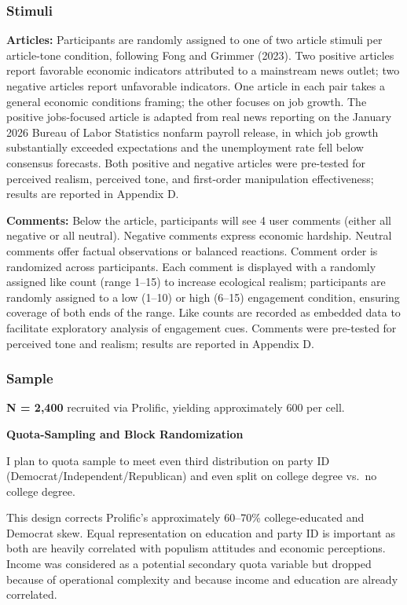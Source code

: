 \documentclass[
  12pt]{article}
\begin{document}
\subsubsection{Stimuli}\label{stimuli}

\textbf{Articles:} Participants are randomly assigned to one of two
article stimuli per article-tone condition, following Fong and Grimmer
(2023). Two positive articles report favorable economic indicators
attributed to a mainstream news outlet; two negative articles report
unfavorable indicators. One article in each pair takes a general
economic conditions framing; the other focuses on job growth. The
positive jobs-focused article is adapted from real news reporting on the
January 2026 Bureau of Labor Statistics nonfarm payroll release, in
which job growth substantially exceeded expectations and the
unemployment rate fell below consensus forecasts. Both positive and
negative articles were pre-tested for perceived realism, perceived tone,
and first-order manipulation effectiveness; results are reported in
Appendix D.

\textbf{Comments:} Below the article, participants will see 4 user
comments (either all negative or all neutral). Negative comments express
economic hardship. Neutral comments offer factual observations or
balanced reactions. Comment order is randomized across participants.
Each comment is displayed with a randomly assigned like count (range
1--15) to increase ecological realism; participants are randomly
assigned to a low (1--10) or high (6--15) engagement condition, ensuring
coverage of both ends of the range. Like counts are recorded as embedded
data to facilitate exploratory analysis of engagement cues. Comments
were pre-tested for perceived tone and realism; results are reported in
Appendix D.

\subsubsection{Sample}\label{sample}

\textbf{N = 2,400} recruited via Prolific, yielding approximately 600
per cell.

\textbf{Quota-Sampling and Block Randomization}

I plan to quota sample to meet even third distribution on party ID
(Democrat/Independent/Republican) and even split on college degree
vs.~no college degree.

This design corrects Prolific's approximately 60--70\% college-educated
and Democrat skew. Equal representation on education and party ID is
important as both are heavily correlated with populism attitudes and
economic perceptions. Income was considered as a potential secondary
quota variable but dropped because of operational complexity and because
income and education are already correlated.
\end{document}
